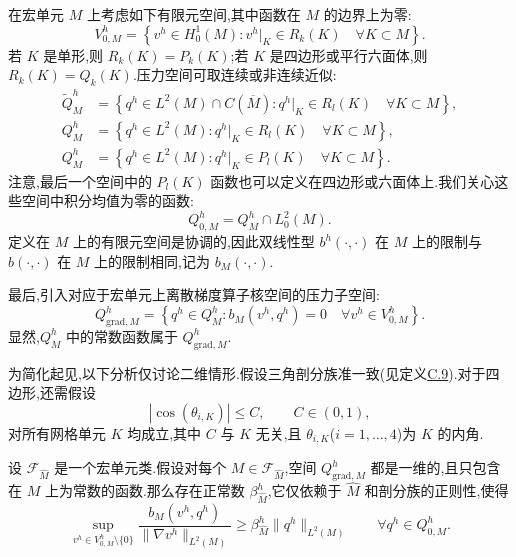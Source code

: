 \begin{note}[宏单元上的函数空间]\label{note:macroelement-function-spaces}
在宏单元 $M$ 上考虑如下有限元空间,其中函数在 $M$ 的边界上为零:
\begin{equation}\label{eq:macroelement-velocity-space}
  V_{0,M}^h
  =\left\{v^h\in H_0^1(M):
       v^h|_K\in R_k(K)\quad\forall K\subset M\right\}.
\end{equation}
若 $K$ 是单形,则 $R_k(K)=P_k(K)$;若 $K$ 是四边形或平行六面体,则 $R_k(K)=Q_k(K)$.压力空间可取连续或非连续近似:
\begin{align*}
  \widetilde Q_M^h
  &=\left\{q^h\in L^2(M)\cap C(\overline M):
       q^h|_K\in R_l(K)\quad\forall K\subset M\right\},\\
  Q_M^h
  &=\left\{q^h\in L^2(M):
       q^h|_K\in R_l(K)\quad\forall K\subset M\right\},\\
  Q_M^h
  &=\left\{q^h\in L^2(M):
       q^h|_K\in P_l(K)\quad\forall K\subset M\right\}.
\end{align*}
注意,最后一个空间中的 $P_l(K)$ 函数也可以定义在四边形或六面体上.我们关心这些空间中积分均值为零的函数:
\[
  Q_{0,M}^h=Q_M^h\cap L_0^2(M).
\]
定义在 $M$ 上的有限元空间是协调的,因此双线性型 $b^h(\cdot,\cdot)$ 在 $M$ 上的限制与 $b(\cdot,\cdot)$ 在 $M$ 上的限制相同,记为 $b_M(\cdot,\cdot)$.

最后,引入对应于宏单元上离散梯度算子核空间的压力子空间:
\[
  Q_{\mathrm{grad},M}^h
  =\left\{q^h\in Q_M^h:
       b_M(v^h,q^h)=0\quad\forall v^h\in V_{0,M}^h\right\}.
\]
显然,$Q_M^h$ 中的常数函数属于 $Q_{\mathrm{grad},M}^h$.
\end{note}

\begin{note}[关于剖分]\label{note:macroelement-triangulations}
为简化起见,以下分析仅讨论二维情形.假设三角剖分族准一致(见定义\hyperref[def:appendix-c-9]{C.9}).对于四边形,还需假设
\begin{equation}\label{eq:macroelement-quadrilateral-angle-condition}
  |\cos(\theta_{i,K})|\le C,\qquad C\in(0,1),
\end{equation}
对所有网格单元 $K$ 均成立,其中 $C$ 与 $K$ 无关,且 $\theta_{i,K}$($i=1,\ldots,4$)为 $K$ 的内角.
\end{note}

\begin{lemma}\label{lem:macroelement-discrete-infsup}
设 $\mathcal{F}_{\widehat M}$ 是一个宏单元类.假设对每个 $M\in\mathcal{F}_{\widehat M}$,空间 $Q_{\mathrm{grad},M}^h$ 都是一维的,且只包含在 $M$ 上为常数的函数.那么存在正常数 $\beta_{\widehat M}^h$,它仅依赖于 $\widehat M$ 和剖分族的正则性,使得
\begin{equation}\label{eq:macroelement-infsup-condition}
  \sup_{v^h\in V_{0,M}^h\setminus\{0\}}
    \frac{b_M(v^h,q^h)}
         {\|\nabla v^h\|_{L^2(M)}}
  \ge \beta_{\widehat M}^h\|q^h\|_{L^2(M)}
  \qquad\forall q^h\in Q_{0,M}^h.
\end{equation}
\end{lemma}


